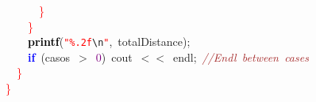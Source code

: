 \mbox{}\ \ \ \ \ \ \textcolor{Red}{\}} \\
\mbox{}\ \ \ \ \textcolor{Red}{\}} \\
\mbox{}\ \ \ \ \textbf{\textcolor{Black}{printf}}\textcolor{BrickRed}{(}\texttt{\textcolor{Red}{"{}\%.2f}}\texttt{\textcolor{CarnationPink}{\textbackslash{}n}}\texttt{\textcolor{Red}{"{}}}\textcolor{BrickRed}{,}\ totalDistance\textcolor{BrickRed}{);} \\
\mbox{}\ \ \ \ \textbf{\textcolor{Blue}{if}}\ \textcolor{BrickRed}{(}casos\ \textcolor{BrickRed}{$>$}\ \textcolor{Purple}{0}\textcolor{BrickRed}{)}\ cout\ \textcolor{BrickRed}{$<$$<$}\ endl\textcolor{BrickRed}{;}\ \textit{\textcolor{Brown}{//Endl\ between\ cases}} \\
\mbox{}\ \ \textcolor{Red}{\}} \\
\mbox{}\textcolor{Red}{\}} \\

